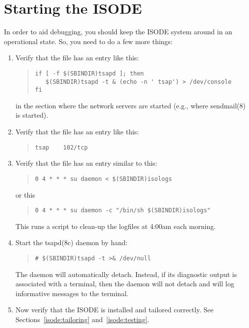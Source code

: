 \section	{Starting the ISODE}
In order to aid debugging,
you should keep the ISODE system around in an operational state.
So,
you need to do a few more things:
\begin{enumerate}
\item	Verify that the file  has an entry like this:
\begin{quote}\small\begin{verbatim}
if [ -f $(SBINDIR)tsapd ]; then
   $(SBINDIR)tsapd -t & (echo -n ' tsap') > /dev/console
fi
\end{verbatim}\end{quote}
in the section where the network servers are started
(e.g., where \man sendmail(8) is started).

\item	Verify that the file  has an entry like this:
\begin{quote}\small\begin{verbatim}
tsap    102/tcp
\end{verbatim}\end{quote}

\item	Verify that the file  has an entry similar 
to this:
\begin{quote}\small\begin{verbatim}
0 4 * * * su daemon < $(SBINDIR)isologs
\end{verbatim}\end{quote}
or this
\begin{quote}\small\begin{verbatim}
0 4 * * * su daemon -c "/bin/sh $(SBINDIR)isologs"
\end{verbatim}\end{quote}
This runs a script to clean-up the logfiles at 4:00am each morning.

\item	Start the \man tsapd(8c) daemon by hand:
\begin{quote}\small\begin{verbatim}
# $(SBINDIR)tsapd -t >& /dev/null
\end{verbatim}\end{quote}
The daemon will automatically detach.
Instead,
if its diagnostic output is associated with a terminal,
then the daemon will not detach and will log informative messages to
the terminal.

\item	Now verify that the ISODE is installed and tailored correctly.
See Sections~\ref{isode:tailoring} and~\ref{isode:testing}.
\end{enumerate}

